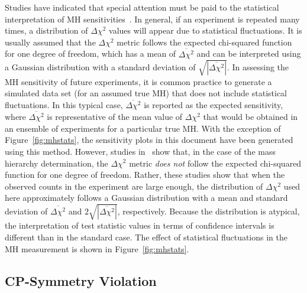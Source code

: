 Studies have indicated that special attention must be paid to the statistical interpretation of MH sensitivities~\cite{Qian:2012zn,Blennow:2013oma}.
In general, if an experiment is repeated many times, a distribution of $\Delta\chi^2$
values will appear due to statistical fluctuations.
It is usually assumed that the $\Delta \chi^2$ metric follows the expected chi-squared
function for one degree of freedom, which has a mean of
$\overline{\Delta\chi^2}$ and can be interpreted using a Gaussian
distribution with a standard deviation of
$\sqrt{|\overline{\Delta\chi^2}|}$.
In assessing the MH sensitivity of future experiments, it is common practice to generate
a simulated data set (for an assumed true MH) that does not include statistical fluctuations. 
In this typical case, $\overline{\Delta\chi^2}$ is reported as the expected sensitivity, 
where $\overline{\Delta\chi^2}$ is representative of the mean value of $\Delta\chi^2$ that 
would be obtained in an ensemble of experiments for a particular true MH.  
With the exception of Figure~\ref{fig:mhstats}, the sensitivity plots
in this document have been generated using this method.
However, studies in~\cite{Qian:2012zn,Blennow:2013oma}
show that, in the case of the mass hierarchy
determination, the $\Delta \chi^2$ metric {\em does not} follow the expected chi-squared
function for one degree of freedom.  Rather, these studies show that
when the observed counts in the experiment are large enough,
the distribution of $\Delta\chi^2$ used here approximately follows
a Gaussian distribution with a
mean and standard deviation of $\overline{\Delta\chi^2}$ and
$2\sqrt{|\overline{\Delta\chi^2}|}$, respectively. Because the distribution is atypical, the interpretation of 
test statistic values in terms of confidence intervals is different than in the standard case. The effect of statistical fluctuations in the MH measurement is shown
in Figure~\ref{fig:mhstats}.



\subsection{CP-Symmetry Violation}
\label{sec:physics-lbnosc-cpv}

